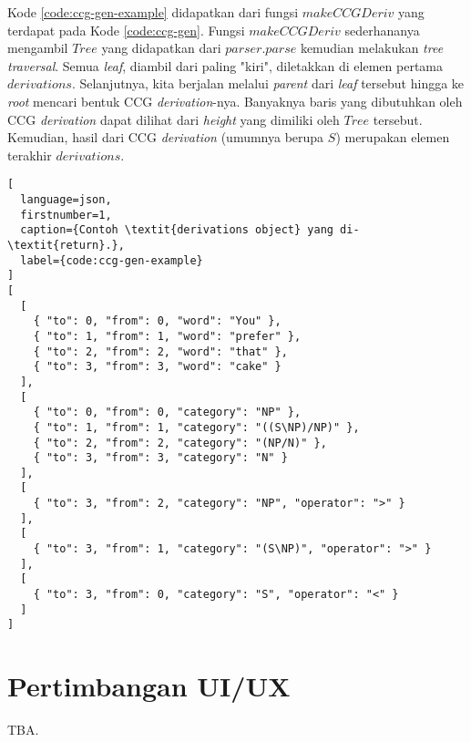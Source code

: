 Kode \ref{code:ccg-gen-example} didapatkan dari fungsi $makeCCGDeriv$ yang terdapat pada
Kode \ref{code:ccg-gen}. Fungsi $makeCCGDeriv$ sederhananya mengambil $Tree$ yang didapatkan
dari $parser.parse$ kemudian melakukan \textit{tree traversal}. Semua \textit{leaf}, diambil
dari paling "kiri", diletakkan di elemen pertama $derivations$. Selanjutnya, kita berjalan
melalui \textit{parent} dari \textit{leaf} tersebut hingga ke \textit{root} mencari bentuk CCG
\textit{derivation}-nya. Banyaknya baris yang dibutuhkan oleh CCG \textit{derivation} dapat
dilihat dari \textit{height} yang dimiliki oleh $Tree$ tersebut. Kemudian, hasil dari CCG
\textit{derivation} (umumnya berupa $S$) merupakan elemen terakhir $derivations$.

\begin{lstlisting}[
  language=json,
  firstnumber=1,
  caption={Contoh \textit{derivations object} yang di-\textit{return}.},
  label={code:ccg-gen-example}
]
[
  [
    { "to": 0, "from": 0, "word": "You" },
    { "to": 1, "from": 1, "word": "prefer" },
    { "to": 2, "from": 2, "word": "that" },
    { "to": 3, "from": 3, "word": "cake" }
  ],
  [
    { "to": 0, "from": 0, "category": "NP" },
    { "to": 1, "from": 1, "category": "((S\NP)/NP)" },
    { "to": 2, "from": 2, "category": "(NP/N)" },
    { "to": 3, "from": 3, "category": "N" }
  ],
  [
    { "to": 3, "from": 2, "category": "NP", "operator": ">" }
  ],
  [
    { "to": 3, "from": 1, "category": "(S\NP)", "operator": ">" }
  ],
  [
    { "to": 3, "from": 0, "category": "S", "operator": "<" }
  ]
]
\end{lstlisting}


\section{Pertimbangan UI/UX}
TBA.

